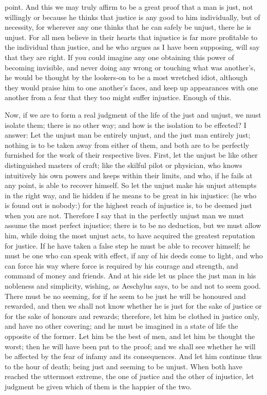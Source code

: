 point. And this we may truly affirm to be a great proof that a man is
just, not willingly or because he thinks that justice is any good to him
individually, but of necessity, for wherever any one thinks that he
can safely be unjust, there he is unjust. For all men believe in their
hearts that injustice is far more profitable to the individual than
justice, and he who argues as I have been supposing, will say that they
are right. If you could imagine any one obtaining this power of becoming
invisible, and never doing any wrong or touching what was another's, he
would be thought by the lookers-on to be a most wretched idiot, although
they would praise him to one another's faces, and keep up appearances
with one another from a fear that they too might suffer injustice.
Enough of this.

Now, if we are to form a real judgment of the life of the just and
unjust, we must isolate them; there is no other way; and how is the
isolation to be effected? I answer: Let the unjust man be entirely
unjust, and the just man entirely just; nothing is to be taken away from
either of them, and both are to be perfectly furnished for the work
of their respective lives. First, let the unjust be like other
distinguished masters of craft; like the skilful pilot or physician, who
knows intuitively his own powers and keeps within their limits, and who,
if he fails at any point, is able to recover himself. So let the unjust
make his unjust attempts in the right way, and lie hidden if he means
to be great in his injustice: (he who is found out is nobody:) for
the highest reach of injustice is, to be deemed just when you are not.
Therefore I say that in the perfectly unjust man we must assume the most
perfect injustice; there is to be no deduction, but we must allow
him, while doing the most unjust acts, to have acquired the greatest
reputation for justice. If he have taken a false step he must be able to
recover himself; he must be one who can speak with effect, if any of his
deeds come to light, and who can force his way where force is required
by his courage and strength, and command of money and friends. And at
his side let us place the just man in his nobleness and simplicity,
wishing, as Aeschylus says, to be and not to seem good. There must be no
seeming, for if he seem to be just he will be honoured and rewarded, and
then we shall not know whether he is just for the sake of justice or
for the sake of honours and rewards; therefore, let him be clothed in
justice only, and have no other covering; and he must be imagined in a
state of life the opposite of the former. Let him be the best of men,
and let him be thought the worst; then he will have been put to the
proof; and we shall see whether he will be affected by the fear of
infamy and its consequences. And let him continue thus to the hour of
death; being just and seeming to be unjust. When both have reached the
uttermost extreme, the one of justice and the other of injustice, let
judgment be given which of them is the happier of the two.

